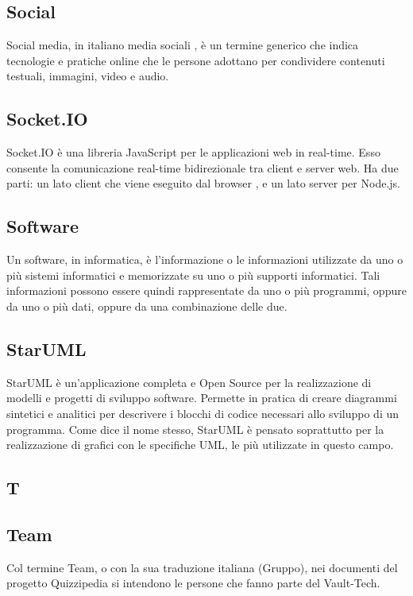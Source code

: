 \subsection*{Social}
Social media, in italiano media sociali , è un termine generico che indica tecnologie e pratiche online che le persone adottano per condividere contenuti testuali, immagini, video e audio.

\subsection*{Socket.IO}
Socket.IO è una libreria JavaScript per le applicazioni web in real-time. Esso consente la comunicazione real-time bidirezionale tra client e server web. Ha due parti: un lato client che viene eseguito dal browser , e un lato server per Node.js.

\subsection*{Software}
Un software, in informatica, è l'informazione o le informazioni utilizzate da uno o più
sistemi informatici e memorizzate su uno o più supporti informatici. Tali informazioni possono
essere quindi rappresentate da uno o più programmi, oppure da uno o più dati, oppure
da una combinazione delle due.

\subsection*{StarUML}
StarUML è un'applicazione completa e Open Source per la realizzazione di modelli e progetti di sviluppo software. Permette in pratica di creare diagrammi sintetici e analitici per descrivere i blocchi di codice necessari allo sviluppo di un programma. Come dice il nome stesso, StarUML è pensato soprattutto per la realizzazione di grafici con le specifiche UML, le più utilizzate in questo campo.

\newpage

\begin{center}
\Huge\section*{\uppercase{T}}
\end{center}

\subsection*{Team}
Col termine Team, o con la sua traduzione italiana (Gruppo), nei documenti del progetto
Quizzipedia si intendono le persone che fanno parte del Vault-Tech.


